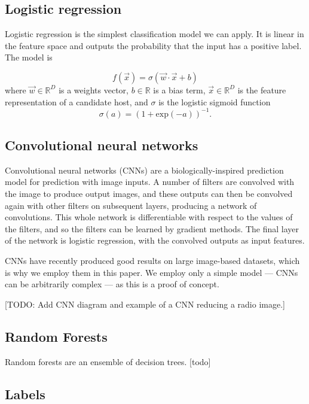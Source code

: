 \documentclass[fleqn,usenatbib,usedcolumn]{mnras}
\begin{document}
  \subsection{Logistic regression}\label{logistic-regression}

    Logistic regression is the simplest classification model we can apply.
    It is linear in the feature space and outputs the probability that the
    input has a positive label. The model is

    \[
        f(\vec x) = \sigma(\vec w \cdot \vec x + b)
    \] where \(\vec w \in \mathbb{R}^D\) is a weights vector,
    \(b \in \mathbb{R}\) is a bias term, \(\vec x \in \mathbb{R}^D\) is the
    feature representation of a candidate host, and \(\sigma\) is the
    logistic sigmoid function \[
        \sigma(a) = (1 + \mathrm{exp}(-a))^{-1}.
    \]

  \subsection{Convolutional neural
  networks}\label{convolutional-neural-networks}

    Convolutional neural networks (CNNs) are a biologically-inspired
    prediction model for prediction with image inputs. A number of filters
    are convolved with the image to produce output images, and these outputs
    can then be convolved again with other filters on subsequent layers,
    producing a network of convolutions. This whole network is
    differentiable with respect to the values of the filters, and so the
    filters can be learned by gradient methods. The final layer of the
    network is logistic regression, with the convolved outputs as input
    features.

    CNNs have recently produced good results on large image-based datasets,
    which is why we employ them in this paper. We employ only a simple model
    --- CNNs can be arbitrarily complex --- as this is a proof of concept.

    {[}TODO: Add CNN diagram and example of a CNN reducing a radio image.{]}

  \subsection{Random Forests}\label{random-forests}

    Random forests are an ensemble of decision trees. {[}todo{]}

  \subsection{Labels}\label{labels}
\end{document}
